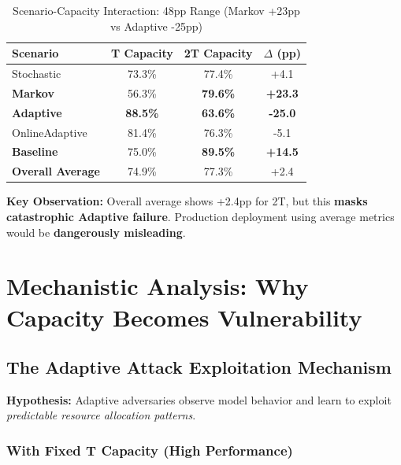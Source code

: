 \documentclass[11pt,a4paper]{article}
\newcommand{\critical}[1]{\textcolor{criticalcolor}{\textbf{#1}}}
\newcommand{\success}[1]{\textcolor{successcolor}{\textbf{#1}}}
\begin{document}
\vspace{-0.4cm}
\begin{table}[H]
\scriptsize
\centering
\begin{tabular}{lccc}
\toprule
\textbf{Scenario} & \textbf{T Capacity} & \textbf{2T Capacity} & \textbf{$\Delta$ (pp)} \\
\midrule
Stochastic & 73.3\% & 77.4\% & +4.1 \\
\success{Markov} & 56.3\% & \success{79.6\%} & \success{+23.3} \\
\critical{Adaptive} & \critical{88.5\%} & \critical{63.6\%} & \critical{-25.0} \\
OnlineAdaptive & 81.4\% & 76.3\% & -5.1 \\
\success{Baseline} & 75.0\% & \success{89.5\%} & \success{+14.5} \\
\midrule
\textbf{Overall Average} & 74.9\% & 77.3\% & +2.4 \\
\bottomrule
\end{tabular}
\vspace{-0.2cm}
\caption{Scenario-Capacity Interaction: 48pp Range (Markov +23pp vs Adaptive -25pp)}
\end{table}

\vspace{-0.2cm}
\textbf{Key Observation:} Overall average shows +2.4pp for 2T, but this \critical{masks catastrophic Adaptive failure}. Production deployment using average metrics would be \textbf{dangerously misleading}.


\section{Mechanistic Analysis: Why Capacity Becomes Vulnerability}

\subsection{The Adaptive Attack Exploitation Mechanism}

\textbf{Hypothesis:} Adaptive adversaries observe model behavior and learn to exploit \textit{predictable resource allocation patterns}.

\subsubsection{With Fixed T Capacity (High Performance)}
\end{document}
